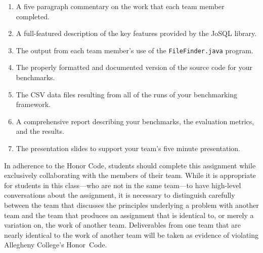
\begin{enumerate}
  \item A five paragraph commentary on the work that each team member completed. 
  \item A full-featured description of the key features provided by the JoSQL library.
  \item The output from each team member's use of the {\tt FileFinder.java} program.
  \item The properly formatted and documented version of the source code for your benchmarks.
  \item The CSV data files resulting from all of the runs of your benchmarking framework.
  \item A comprehensive report describing your benchmarks, the evaluation metrics, and the results.
    \item The presentation slides to support your team's five minute presentation.
\end{enumerate}


In adherence to the Honor Code, students should complete this assignment while exclusively collaborating with the
members of their team. While it is appropriate for students in this class---who are not in the same team---to have
high-level conversations about the assignment, it is necessary to distinguish carefully between the team that discusses
the principles underlying a problem with another team and the team that produces an assignment that is identical to, or
merely a variation on, the work of another team.  Deliverables from one team that are nearly identical to the work of
another team will be taken as evidence of violating Allegheny College's \mbox{Honor Code}.






